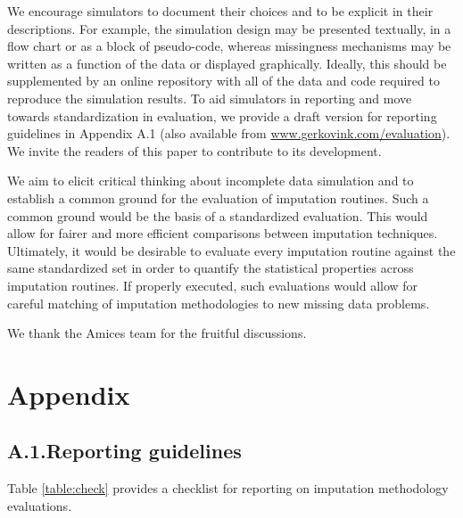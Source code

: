 \documentclass[bimj,fleqn]{w-art}
\begin{document}
We encourage simulators to document their choices and to be explicit in their descriptions. For example, the simulation design may be presented textually, in a flow chart or as a block of pseudo-code, whereas missingness mechanisms may be written as a function of the data or displayed graphically. Ideally, this should be supplemented by an online repository with all of the data and code required to reproduce the simulation results. To aid simulators in reporting and move towards standardization in evaluation, we provide a draft version for reporting guidelines in Appendix A.1 (also available from \underline{www.gerkovink.com/evaluation}). We invite the readers of this paper to contribute to its development. 

We aim to elicit critical thinking about incomplete data simulation and to establish a common ground for the evaluation of imputation routines. Such a common ground would be the basis of a standardized evaluation. This would allow for fairer and more efficient comparisons between imputation techniques. Ultimately, it would be desirable to evaluate every imputation routine against the same standardized set in order to quantify the statistical properties across imputation routines. If properly executed, such evaluations would allow for careful matching of imputation methodologies to new missing data problems. 



\begin{acknowledgement}
We thank the Amices team for the fruitful discussions.
\end{acknowledgement}
\vspace*{1pc}



\section*{Appendix}

\subsection*{A.1.\enspace Reporting guidelines}

Table \ref{table:check} provides a checklist for reporting on imputation methodology evaluations. 
\end{document}

